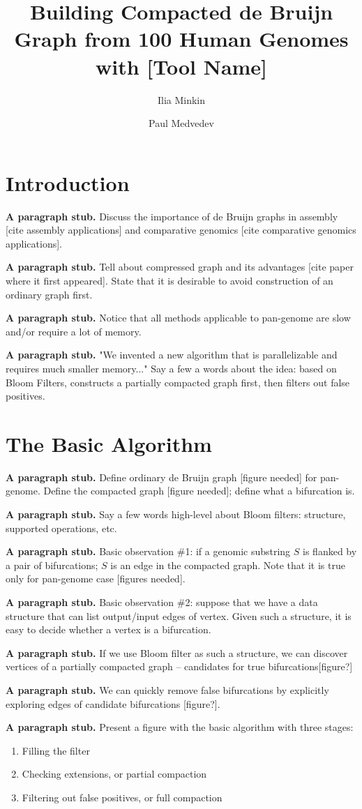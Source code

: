 \documentclass{llncs}
\title{Building Compacted de Bruijn Graph from 100 Human Genomes with [Tool Name]}
\author{Ilia Minkin\inst{1} \and Paul Medvedev\inst{1}}
\institute{Department of Computer Science and Engineering, The Pennsylvania State University, USA}
\newcommand{\stub}{\textbf{A paragraph stub. }}
\begin{document}
\maketitle
\section{Introduction}

\stub Discuss the importance of de Bruijn graphs \cite{bruijn1946combinatorial} in assembly [cite assembly applications]  and comparative genomics [cite comparative genomics applications].

\stub Tell about compressed graph and its  advantages [cite paper where it first appeared].
State that it is desirable to avoid construction of an ordinary graph first.

\stub Notice that all methods applicable to pan-genome are slow and/or require a lot of memory.

\stub "We invented a new algorithm that is parallelizable and requires much smaller memory..." 
Say a few a words about the idea: based on Bloom Filters, constructs a partially compacted graph first, then filters out false positives.

\section{The Basic Algorithm}
\stub Define ordinary de Bruijn graph [figure needed] for pan-genome.
Define the compacted graph [figure needed]; define what a bifurcation is.

\stub Say a few words high-level about Bloom filters: structure, supported operations, etc.

\stub Basic observation \#1: if a genomic substring $S$ is flanked by a pair of bifurcations; $S$ is an edge in the compacted graph.
Note that it is true only for pan-genome case [figures needed].

\stub Basic observation \#2: suppose that we have a data structure that can list output/input edges of vertex.
Given such a structure, it is easy to decide whether a vertex is a bifurcation.

\stub If we use Bloom filter as such a structure, we can discover vertices of a partially compacted graph -- candidates for true bifurcations[figure?]

\stub We can quickly remove false bifurcations by explicitly exploring edges of candidate bifurcations  [figure?].

\stub Present a figure with the basic algorithm with three stages: 
\begin{enumerate}
	\item Filling the filter
	\item Checking extensions, or partial compaction
	\item Filtering out false positives, or full compaction
\end{enumerate}
\end{document}
